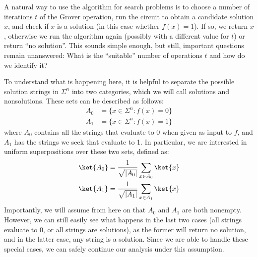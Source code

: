 \begin{center}
%
\end{center}
A natural way to use the algorithm for search problems is to choose a number of iterations $t$ of the Grover operation, run the circuit to obtain a candidate solution $x$, and check if $x$ is a solution (in this case whether $f(x) = 1$). If so, we return $x$, otherwise we run the algorithm again (possibly with a different value for $t$) or return ``no solution''. This sounds simple enough, but still, important questions remain unanswered: What is the ``suitable'' number of operations $t$ and how do we identify it?

To understand what is happening here, it is helpful to separate the possible solution strings in $\Sigma^n$ into two categories, which we will call solutions and nonsolutions. These sets can be described as follows:
\begin{align*}
    A_0 &= \{x \in \Sigma^n: f(x) = 0\}\\
    A_1 &= \{x \in \Sigma^n: f(x) = 1\}
\end{align*}
where $A_0$ contains all the strings that evaluate to 0 when given as input to $f$, and $A_1$ has the strings we seek that evaluate to 1. In particular, we are interested in uniform superpositions over these two sets, defined as:
\begin{align*}
    \ket{A_0} &= \frac{1}{\sqrt{|A_0|}}\sum_{x \in A_0} \ket{x} \\
    \ket{A_1} &= \frac{1}{\sqrt{|A_1|}}\sum_{x \in A_1} \ket{x}
\end{align*}
Importantly, we will assume from here on that $A_0$ and $A_1$ are both nonempty. However, we can still easily see what happens in the last two cases (all strings evaluate to 0, or all strings are solutions), as the former will return no solution, and in the latter case, any string is a solution. Since we are able to handle these special cases, we can safely continue our analysis under this assumption.

